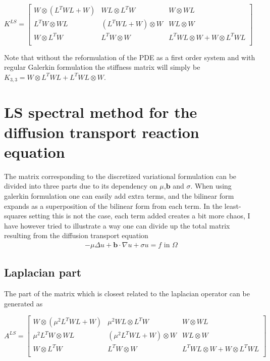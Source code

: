 %
$
K^{LS} = 
\begin{bmatrix}
	W \otimes (L^TWL+W) & WL \otimes L^TW 		 &	W \otimes WL  \\ 	
	L^TW \otimes WL     & (L^TWL+W) \otimes W  &	WL \otimes W  \\ 	
	W \otimes L^TW		  & L^TW \otimes W       &  L^TWL \otimes W +	W\otimes L^TWL  \\ 	
\end{bmatrix}
$

Note that without the reformulation of the PDE as a first order system and with regular Galerkin formulation the stiffness matrix will simply be 
$K_{3,3} = W \otimes L^TWL+ L^TWL \otimes W$.
\section{LS spectral method for the diffusion transport reaction equation}
The matrix corresponding to the discretized variational formulation can be divided into three parts due to its dependency on $\mu$,$\mathbf{b}$ and $\sigma$. When using galerkin formulation one can easily add extra terms, and the bilinear form expands as a superposition of the bilinear form from each term. In the least-squares setting this is not the case, each term added creates a bit more chaos, I have however tried to illustrate a way one can divide up the total matrix resulting from the diffusion transport equation
\begin{align}
	-\mu \Delta u + \mathbf{b} \cdot \nabla u +\sigma u = f \text{ in } \Omega
	\label{eq:ReactionImplementation}
\end{align}
\subsection{Laplacian part}
The part of the matrix which is closest related to the laplacian operator can be generated as 

$
A^{LS} = 
\begin{bmatrix}
	W \otimes (\mu^2 L^TWL+W) & \mu^2 WL \otimes L^TW 		 &	W \otimes WL  \\ 	
	\mu^2 L^TW \otimes WL     & (\mu^2 L^TWL+W) \otimes W  &	WL \otimes W  \\ 	
	W \otimes L^TW		  & L^TW \otimes W       &  L^TWL \otimes W +	W\otimes L^TWL  \\ 	
\end{bmatrix}
$

